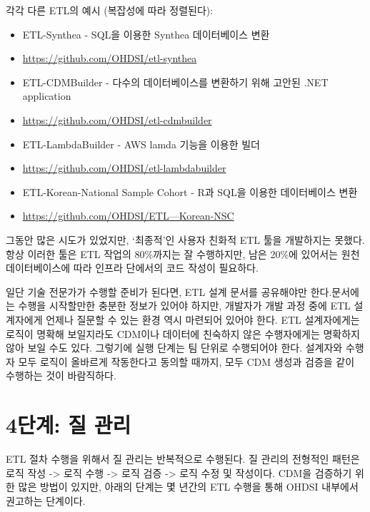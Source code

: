 \documentclass[10.5pt]{book}
\providecommand{\tightlist}{%
  \setlength{\itemsep}{0pt}\setlength{\parskip}{0pt}}
\theoremstyle{definition}
\theoremstyle{definition}
\theoremstyle{definition}
\theoremstyle{remark}
\begin{document}
각각 다른 ETL의 예시 (복잡성에 따라 정렬된다):

\begin{itemize}
\tightlist
\item
  ETL-Synthea - SQL을 이용한 Synthea 데이터베이스 변환
\item
  \url{https://github.com/OHDSI/etl-synthea}
\item
  ETL-CDMBuilder - 다수의 데이터베이스를 변환하기 위해 고안된 .NET
  application
\item
  \url{https://github.com/OHDSI/etl-cdmbuilder}
\item
  ETL-LambdaBuilder - AWS lamda 기능을 이용한 빌더
\item
  \url{https://github.com/OHDSI/etl-lambdabuilder}
\item
  ETL-Korean-National Sample Cohort - R과 SQL을 이용한 데이터베이스 변환
\item
  \href{https://github.com/OHDSI/ETL---Korean-NSC}{https://github.com/OHDSI/ETL---Korean-NSC}
\end{itemize}

그동안 많은 시도가 있었지만, `최종적'인 사용자 친화적 ETL 툴을
개발하지는 못했다. 항상 이러한 툴은 ETL 작업의 80\%까지는 잘 수행하지만,
남은 20\%에 있어서는 원천 데이터베이스에 따라 인프라 단에서의 코드
작성이 필요하다.

일단 기술 전문가가 수행할 준비가 된다면, ETL 설계 문서를 공유해야만
한다.문서에는 수행을 시작할만한 충분한 정보가 있어야 하지만, 개발자가
개발 과정 중에 ETL 설계자에게 언제나 질문할 수 있는 환경 역시 마련되어
있어야 한다. ETL 설계자에게는 로직이 명확해 보일지라도 CDM이나 데이터에
친숙하지 않은 수행자에게는 명확하지 않아 보일 수도 있다. 그렇기에 실행
단계는 팀 단위로 수행되어야 한다. 설계자와 수행자 모두 로직이 올바르게
작동한다고 동의할 때까지, 모두 CDM 생성과 검증을 같이 수행하는 것이
바람직하다.

\section{4단계: 질 관리}\label{--}

ETL 절차 수행을 위해서 질 관리는 반복적으로 수행된다. 질 관리의 전형적인
패턴은 로직 작성 -\textgreater{} 로직 수행 -\textgreater{} 로직 검증
-\textgreater{} 로직 수정 및 작성이다. CDM을 검증하기 위한 많은 방법이
있지만, 아래의 단계는 몇 년간의 ETL 수행을 통해 OHDSI 내부에서 권고하는
단계이다. 
\end{document}
